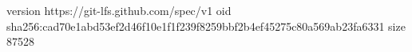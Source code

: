 version https://git-lfs.github.com/spec/v1
oid sha256:cad70e1abd53ef2d46f10e1f1f239f8259bbf2b4ef45275c80a569ab23fa6331
size 87528
